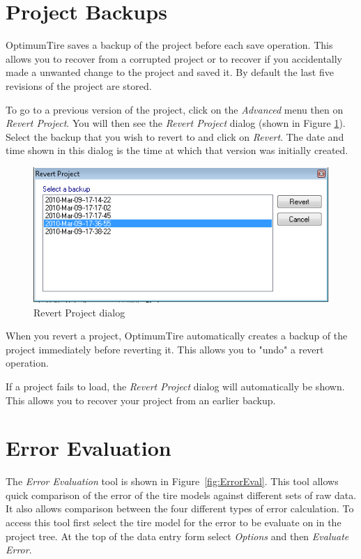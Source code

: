 \section{Project Backups}
\label{sec:ProjectBackups}

OptimumTire saves a backup of the project before each save operation. This allows you to recover from a corrupted project or to recover if you accidentally made a unwanted change to the project and saved it. By default the last five revisions of the project are stored.

To go to a previous version of the project, click on the \textsl{Advanced} menu then on \textsl{Revert Project}. You will then see the \textsl{Revert Project} dialog (shown in Figure \ref{fig:RevertProject}). Select the backup that you wish to revert to and click on \textsl{Revert}. The date and time shown in this dialog is the time at which that version was initially created.

\begin{figure}[H]
	\centering
		\includegraphics[width=1.0\textwidth]{RevertProject.png}
	\caption{Revert Project dialog}
	\label{fig:RevertProject}
\end{figure}

When you revert a project, OptimumTire automatically creates a backup of the project immediately before reverting it. This allows you to "undo" a revert operation.

If a project fails to load, the \textsl{Revert Project} dialog will automatically be shown. This allows you to recover your project from an earlier backup.

\section{Error Evaluation}
\label{sec:ErrorEvaluation}

The \textsl{Error Evaluation} tool is shown in Figure~\ref{fig:ErrorEval}. This tool allows quick comparison of the error of the tire models against different sets of raw data. It also allows comparison between the four different types of error calculation. To access this tool first select the tire model for the error to be evaluate on in the project tree. At the top of the data entry form select \textsl{Options} and then \textsl{Evaluate Error}.

